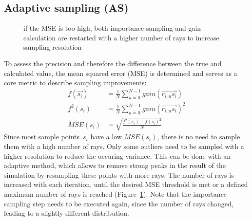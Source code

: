 \subsection{Adaptive sampling (AS)}
\label{subsec:adaptive_sampling}
\begin{figure}[H]
  \centerline
  {}
  \caption{if the MSE is too high, both importance sampling and gain calculation
  are restarted with a higher number of rays to increase sampling resolution}
  \label{graphic:pap3}
\end{figure}
To assess the precision
and therefore the difference between the true and calculated value,
the mean squared error (MSE) is determined and serves as a core metric to
describe sampling improvements:
\begin{align}
     f(\vec{s_i}) &= \frac{1}{N} \sum_{u=0}^{N-1} gain(\overrightarrow{r_{i,u}s_i})\\
     f^2(s_i)     &= \frac{1}{N} \sum_{u=0}^{N-1} gain(\overrightarrow{r_{i,u}s_i})^2\\
     MSE(s_i)     &= \sqrt{\frac{f^2(s_i) - f(s_i)^2}{N}}
\end{align}
Since most sample points~$s_i$ have a low $MSE(s_i)$, there is no need
to sample them with a high number of rays. Only some outliers need to
be sampled with a higher resolution to reduce the occuring variance. This can be done with an adaptive
method, which allows to remove strong peaks in the result
of the simulation by resampling these points with more rays. The number of rays
is increased with each iteration, until the desired MSE threshold is met or 
a defined maximum number of rays is reached (Figure~\ref{graphic:pap3}).
Note that the importance sampling step needs to be executed again, since
the number of rays changed, leading to a slightly different distribution.

